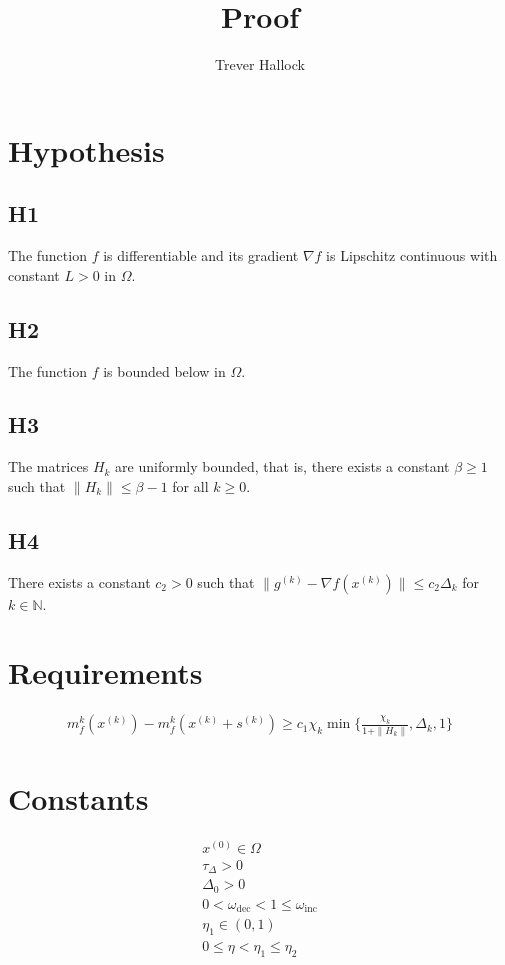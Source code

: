 \documentclass{article}
\title{Proof}
\author{Trever Hallock}
\newcommand{\grad}{\nabla f}
\newcommand{\xk}{{x}^{(k)}}
\newcommand{\ints}{\mathbb N}
\newcommand{\dk}{\Delta_k}
\newcommand{\pik}{\chi_k}
\newcommand{\sk}{{s^{(k)}}}
\newcommand{\mk}{{m_f^{k}}}
\newcommand{\gk}{{g^{(k)}}}
\newcommand{\tone}{\omega_{\text{dec}}}
\newcommand{\ttwo}{\omega_{\text{inc}}}
\newcommand{\oalpha}{\tau_{\Delta}}
\begin{document}
\maketitle

\section{Hypothesis}
\subsection{H1}
The function $f$ is differentiable and its gradient $\grad$ is Lipschitz continuous with constant $L > 0$ in $ \Omega $.
\subsection{H2}
The function $f$ is bounded below in $ \Omega $.
\subsection{H3}
The matrices $H_k$ are uniformly bounded, that is, there exists a constant $ \beta \ge 1 $ such that $\|H_k\| \le \beta - 1$ for all $k \ge 0$.
\subsection{H4}
There exists a constant $c_2 > 0$ such that $ \| \gk - \grad(\xk) \| \le c_2 \dk $ for $k \in \ints $.

\section{Requirements}

\begin{align*}
\mk(\xk) - \mk(\xk + \sk) \ge c_1 \pik \min\{\frac{\pik}{1 + \|H_k\|}, \dk, 1\}
\end{align*}

\section{Constants}

\begin{align*}
x^{(0)} \in \Omega \\
\oalpha > 0 \\
\Delta_0 > 0 \\
0 < \tone < 1 \le \ttwo \\
\eta_1 \in (0, 1) \\
0 \le \eta < \eta_1 \le \eta_2
\end{align*}
\end{document}
